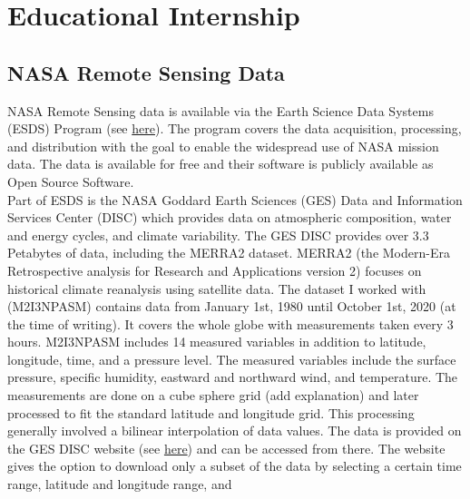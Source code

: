 \documentclass[../00_main.tex]{subfiles}
\begin{document}
\section{Educational Internship}

\subsection{NASA Remote Sensing Data}

NASA Remote Sensing data is available via the Earth Science Data Systems (ESDS)
Program (see \href{https://earthdata.nasa.gov/esds}{here}). The program covers the
data acquisition, processing, and distribution with the goal to enable the
widespread use of NASA mission data. The data is available for free and their
software is publicly available as Open Source Software.\\ 
Part of ESDS is the NASA Goddard Earth Sciences (GES) Data and Information 
Services Center (DISC) which provides data on atmospheric composition, water
and energy cycles, and climate variability. 
The GES DISC provides over 3.3 Petabytes of data,
including the MERRA2 dataset. MERRA2 (the Modern-Era Retrospective analysis for
Research and Applications version 2) focuses on historical climate reanalysis
using satellite data. The dataset I worked with (M2I3NPASM) contains data from
January 1st, 1980 until October 1st, 2020 (at the time of writing). It covers
the whole globe with measurements taken every 3 hours.
M2I3NPASM includes 14 measured variables in addition to latitude, longitude,
time, and a pressure level. The measured variables include the surface pressure,
specific humidity, eastward and northward wind, and temperature. 
The measurements are done on a cube sphere grid (add explanation) and later
processed to fit the standard latitude and longitude grid. This processing
generally involved a bilinear interpolation of data values.\newline
The data is provided on the GES DISC website (see
\href{https://disc.gsfc.nasa.gov/datasets/M2I3NPASM_5.12.4/summary}{here}) and can be
accessed from there. The website gives the option to download only a subset of
the data by selecting a certain time range, latitude and longitude range, and
\end{document}
